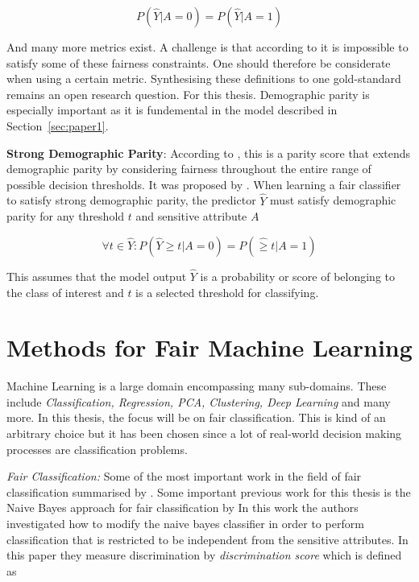 \begin{equation}
    P(\hat{Y}|A=0) = P(\hat{Y}|A=1)
    \label{eq:dempar}
\end{equation}

And many more metrics exist. A challenge is that according to \citet{Mehrabi:2021:CSUR, Kleinberg:2017:LIPIcs} it is impossible to satisfy some of these fairness constraints. One should therefore be considerate when using a certain metric. Synthesising these definitions to one gold-standard remains an open research question. For this thesis. Demographic parity is especially important as it is fundemental in the model described in Section~\ref{sec:paper1}.

\textbf{Strong Demographic Parity}: According to \citet{Antonio:2021:arXiv}, this is a parity score that extends demographic parity by considering fairness throughout the entire range of possible decision thresholds. It was proposed by \citet{Jiang:2020:PMLR}. When learning a fair classifier to satisfy strong demographic parity, the predictor $\hat{Y}$ must satisfy demographic parity for any threshold $t$ and sensitive attribute $A$

$$
\forall t \in \hat{Y} : P(\hat{Y} \geq t | A = 0) = P(\hat \geq t | A = 1)
$$

This assumes that the model output $\hat{Y}$ is a probability or score of belonging to the class of interest and $t$ is a selected threshold for classifying.

\section{Methods for Fair Machine Learning}

Machine Learning is a large domain encompassing many sub-domains. These include \textit{Classification, Regression, PCA, Clustering, Deep Learning} and many more. In this thesis, the focus will be on fair classification. This is kind of an arbitrary choice but it has been chosen since a lot of real-world decision making processes are classification problems. 

\textit{Fair Classification:} Some of the most important work in the field of fair classification summarised by \cite{Mehrabi:2021:CSUR}. Some important previous work for this thesis is the Naive Bayes approach for fair classification by \citet{Calders:20210:DMKD} In this work the authors investigated how to modify the naive bayes classifier in order to perform classification that is restricted to be independent from the sensitive attributes. In this paper they measure discrimination by \textit{discrimination score} which is defined as

